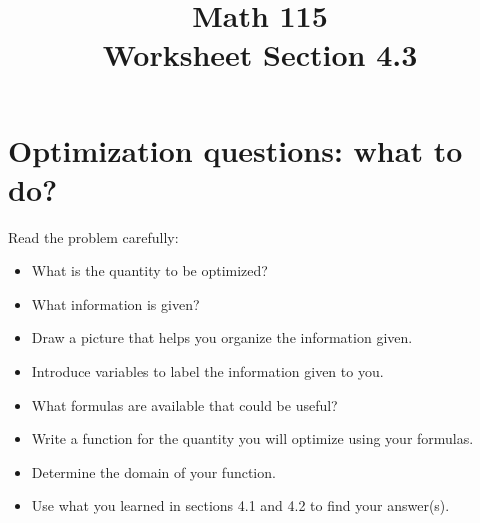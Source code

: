 \documentclass[11pt]{exam}
\title{\vspace{-0.5in} Math 115 \\ Worksheet Section 4.3}
\date{}
\begin{document}
\maketitle
\vspace{-0.75in}
\section*{Optimization questions: what to do?}


\noindent
Read the problem carefully:
\begin{itemize}
\item What is the quantity to be optimized? 
\item What information is given?
\item Draw a picture that helps you organize the information given.
\item Introduce variables to label the information given to you.
\item What formulas are available that could be useful?
\item Write a function for the quantity you will optimize using your formulas. 
\item Determine the domain of your function.
\item Use what you learned in sections 4.1 and 4.2 to find your answer(s).
\end{itemize}
\end{document}
